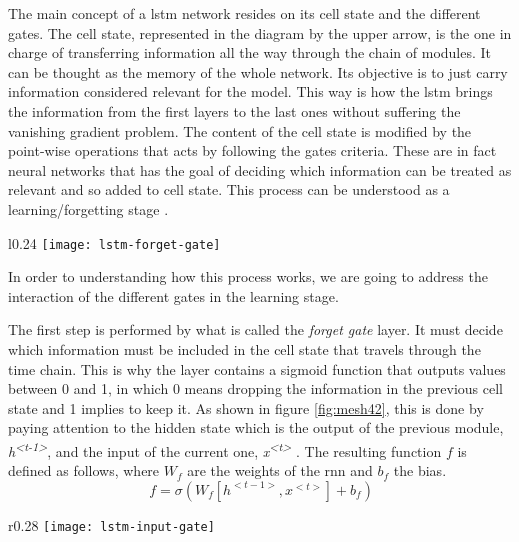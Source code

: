 	The main concept of a \acrshort{lstm} network resides on its cell state and the different gates. The cell state, represented in the diagram by the upper arrow, is the one in charge of transferring information all the way through the chain of modules. It can be thought as the memory of the whole network. Its objective is to just carry information considered relevant for the model. This way is how the \acrshort{lstm} brings the information from the first layers to the last ones without suffering the vanishing gradient problem. The content of the cell state is modified by the point-wise operations that acts by following the gates criteria. These are in fact neural networks that has the goal of deciding which information can be treated as relevant and so added to cell state. This process can be understood as a learning/forgetting stage \cite{Nguyen2018}. 
	
	\begin{wrapfigure}[9]{l}{0.24\textwidth}
		\centering
		\captionsetup{justification=centering}
		\texttt{[image: lstm-forget-gate]}
		\caption{Forget gate}
		\label{fig:mesh42}
	\end{wrapfigure}

	In order to understanding how this process works, we are going to address the interaction of the different gates in the learning stage.

	The first step is performed by what is called the \textit{forget gate} layer. It must decide which information must be included in the cell state that travels through the time chain. This is why the layer contains a sigmoid function that outputs values between  0 and 1, in which  0 means dropping the information in the previous cell state and 1 implies to keep it. As shown in figure \ref{fig:mesh42}, this is done by paying attention to the hidden state which is the output of the previous module, \textit{h\textsuperscript{<t-1>}}, and the input of the current one, \textit{x\textsuperscript{<t>}} \cite{Nguyen2018}. The resulting function $f$ is defined as follows, where $W_{f}$ are the weights of the \acrshort{rnn} and $b_{f}$ the bias.
	\[
	\ f = \sigma(W_{f}[h^{<t-1>}, x^{<t>}] + b_{f})
	\]
	
	\begin{wrapfigure}{r}{0.28\textwidth}
		\centering
		\captionsetup{justification=centering}
		\texttt{[image: lstm-input-gate]}
		\caption{Input gate}
		\label{fig:mesh43}
	\end{wrapfigure}
	
